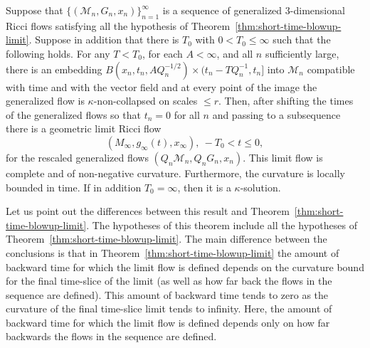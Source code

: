 \begin{theorem}
\label{thm:long-time-blowup-limit}
\label{kaplimit}
Suppose that $\{({\mathcal M}_n,G_n,x_n)\}_{n=1}^\infty$ is a
sequence of generalized $3$-dimensional Ricci flows satisfying all
the hypothesis of Theorem~\ref{thm:short-time-blowup-limit}. Suppose in addition that
there is  $T_0$ with $0<T_0\le \infty$ such that the following
holds. For any $T<T_0$, for each $A<\infty$, and all $n$
sufficiently large, there is an embedding
$B(x_n,t_n,AQ_n^{-1/2})\times (t_n-TQ_n^{-1},t_n]$ into ${\mathcal
M}_n$ compatible with time and with the vector field and at every
point of the image the generalized flow is
$\kappa$-non-collapsed on scales $\le
r$. Then, after shifting the times of the generalized flows so that
$t_n=0$ for all $n$ and passing to a subsequence there is a
geometric limit Ricci flow
$$(M_\infty,g_\infty(t),x_\infty),\ -T_0<t\le 0,$$
for the rescaled generalized flows $(Q_n{\mathcal M}_n,Q_nG_n,x_n)$.
This limit flow is complete and of  non-negative curvature.
Furthermore, the curvature is locally bounded in time. If in
addition $T_0=\infty$, then it is a $\kappa$-solution.
\end{theorem}


\begin{remark}
\label{rem:comparison-short-and-long-time-limits}
Let us point out the differences between this result and
Theorem~\ref{thm:short-time-blowup-limit}. The hypotheses of this theorem include all
the hypotheses of Theorem~\ref{thm:short-time-blowup-limit}. The main difference
between the conclusions is that in Theorem~\ref{thm:short-time-blowup-limit} the
amount of backward time for which the limit flow is defined depends
on the curvature bound for the final time-slice of the limit (as
well as how far back the flows in the sequence are defined). This
amount of backward time tends to zero as the curvature of the final
time-slice limit tends to infinity. Here, the amount of backward
time for which the limit flow is defined depends only on how far
backwards the flows in the sequence are defined.
\end{remark}


